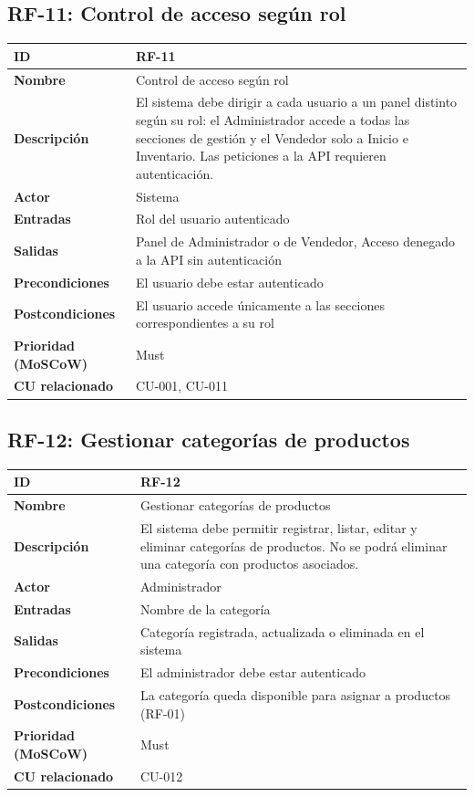 \documentclass[12pt, a4paper]{article}
\begin{document}
\subsection{RF-11: Control de acceso según rol}
\begin{center}
\renewcommand{\arraystretch}{1.4}
\begin{tabular}{|L{4cm}|L{12cm}|}
\hline
\textbf{ID} & RF-11 \\
\hline
\textbf{Nombre} & Control de acceso según rol \\
\hline
\textbf{Descripción} & El sistema debe dirigir a cada usuario a un panel distinto según su rol: el Administrador accede a todas las secciones de gestión y el Vendedor solo a Inicio e Inventario. Las peticiones a la API requieren autenticación. \\
\hline
\textbf{Actor} & Sistema \\
\hline
\textbf{Entradas} & Rol del usuario autenticado \\
\hline
\textbf{Salidas} & Panel de Administrador o de Vendedor, Acceso denegado a la API sin autenticación \\
\hline
\textbf{Precondiciones} & El usuario debe estar autenticado \\
\hline
\textbf{Postcondiciones} & El usuario accede únicamente a las secciones correspondientes a su rol \\
\hline
\textbf{Prioridad (MoSCoW)} & Must \\
\hline
\textbf{CU relacionado} & CU-001, CU-011 \\
\hline
\end{tabular}
\end{center}

\subsection{RF-12: Gestionar categorías de productos}
\begin{center}
\renewcommand{\arraystretch}{1.4}
\begin{tabular}{|L{4cm}|L{12cm}|}
\hline
\textbf{ID} & RF-12 \\
\hline
\textbf{Nombre} & Gestionar categorías de productos \\
\hline
\textbf{Descripción} & El sistema debe permitir registrar, listar, editar y eliminar categorías de productos. No se podrá eliminar una categoría con productos asociados. \\
\hline
\textbf{Actor} & Administrador \\
\hline
\textbf{Entradas} & Nombre de la categoría \\
\hline
\textbf{Salidas} & Categoría registrada, actualizada o eliminada en el sistema \\
\hline
\textbf{Precondiciones} & El administrador debe estar autenticado \\
\hline
\textbf{Postcondiciones} & La categoría queda disponible para asignar a productos (RF-01) \\
\hline
\textbf{Prioridad (MoSCoW)} & Must \\
\hline
\textbf{CU relacionado} & CU-012 \\
\hline
\end{tabular}
\end{center}
\end{document}
